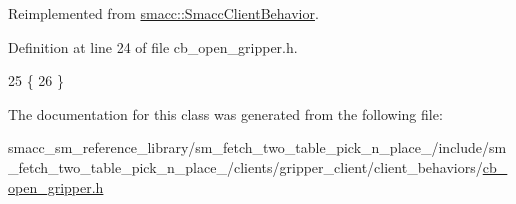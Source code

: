 Reimplemented from \hyperlink{classsmacc_1_1SmaccClientBehavior_a7e4fb6ce81ff96dc172425852d69c0c5}{smacc\+::\+Smacc\+Client\+Behavior}.



Definition at line 24 of file cb\+\_\+open\+\_\+gripper.\+h.


\begin{DoxyCode}
25     \{
26     \}
\end{DoxyCode}


The documentation for this class was generated from the following file\+:\begin{DoxyCompactItemize}
\item 
smacc\+\_\+sm\+\_\+reference\+\_\+library/sm\+\_\+fetch\+\_\+two\+\_\+table\+\_\+pick\+\_\+n\+\_\+place\+\_/include/sm\+\_\+fetch\+\_\+two\+\_\+table\+\_\+pick\+\_\+n\+\_\+place\+\_/clients/gripper\+\_\+client/client\+\_\+behaviors/\hyperlink{sm__fetch__two__table__pick__n__place__1_2include_2sm__fetch__two__table__pick__n__place__1_2clifd54e3ade7c7ed86b168f26e040f7921}{cb\+\_\+open\+\_\+gripper.\+h}\end{DoxyCompactItemize}
